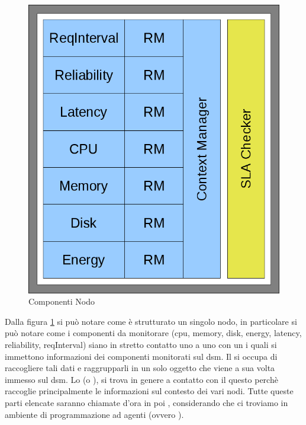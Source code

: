 \begin{figure}[H]
\begin{center}
\includegraphics[scale=0.5]{etc/nodo.png}
\caption{Componenti Nodo}
\label{componentinodo}
\end{center}
\end{figure}
Dalla figura \ref{componentinodo} si può notare come è strutturato un singolo nodo, in particolare si può notare come i componenti da monitorare (cpu, memory, disk, energy, latency, reliability, reqInterval) siano in stretto contatto uno a uno con un  i quali si immettono informazioni dei componenti monitorati sul dsm. Il  si occupa di raccogliere tali dati e raggrupparli in un solo oggetto che viene a sua volta immesso sul dsm. Lo  (o ), si trova in genere a contatto con il  questo perchè raccoglie principalmente le informazioni sul contesto dei vari nodi. Tutte queste parti elencate saranno chiamate d'ora in poi , considerando che ci troviamo in ambiente di programmazione ad agenti (ovvero ).
